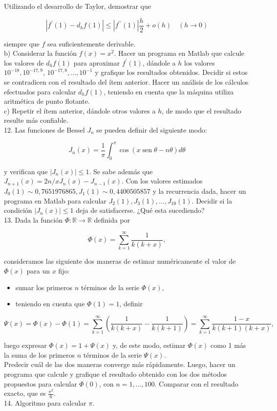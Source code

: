 \documentclass[10pt]{book}
\begin{document}
Utilizando el desarrollo de Taylor, demostrar que

$$
\left|f^{\prime}(1)-d_{h} f(1)\right| \leq\left|f^{\prime \prime}(1)\right| \frac{h}{2}+o(h) \quad(h \rightarrow 0)
$$

siempre que $f$ sea suficientemente derivable.\\
b) Considerar la función $f(x)=x^{2}$. Hacer un programa en Matlab que calcule los valores de $d_{h} f(1)$ para aproximar $f^{\prime}(1)$, dándole a $h$ los valores $10^{-18}, 10^{-17,9}$, $10^{-17,8}, \ldots, 10^{-1}$ y grafique los resultados obtenidos. Decidir si estos se contradicen con el resultado del ítem anterior. Hacer un análisis de los cálculos efectuados para calcular $d_{h} f(1)$, teniendo en cuenta que la máquina utiliza aritmética de punto flotante.\\
c) Repetir el ítem anterior, dándole otros valores a $h$, de modo que el resultado resulte más confiable.\\
12. Las funciones de Bessel $J_{n}$ se pueden definir del siguiente modo:

$$
J_{n}(x)=\frac{1}{\pi} \int_{0}^{\pi} \cos (x \operatorname{sen} \theta-n \theta) d \theta
$$

y verifican que $\left|J_{n}(x)\right| \leq 1$. Se sabe además que $J_{n+1}(x)=2 n / x J_{n}(x)-J_{n-1}(x)$. Con los valores estimados $J_{0}(1) \sim 0,7651976865, J_{1}(1) \sim 0,4400505857$ y la recurrencia dada, hacer un programa en Matlab para calcular $J_{2}(1), J_{3}(1), \ldots, J_{10}(1)$. Decidir si la condición $\left|J_{n}(x)\right| \leq 1$ deja de satisfacerse. ¿Qué esta sucediendo?\\
13. Dada la función $\Phi: \mathbb{R} \rightarrow \mathbb{R}$ definida por

$$
\Phi(x)=\sum_{k=1}^{\infty} \frac{1}{k(k+x)},
$$

consideramos las siguiente dos maneras de estimar numéricamente el valor de $\Phi(x)$ para un $x$ fijo:

\begin{itemize}
  \item sumar los primeros $n$ términos de la serie $\Phi(x)$,
  \item teniendo en cuenta que $\Phi(1)=1$, definir
\end{itemize}

$$
\Psi(x)=\Phi(x)-\Phi(1)=\sum_{k=1}^{\infty}\left(\frac{1}{k(k+x)}-\frac{1}{k(k+1)}\right)=\sum_{k=1}^{\infty} \frac{1-x}{k(k+1)(k+x)},
$$

luego expresar $\Phi(x)=1+\Psi(x)$ y, de este modo, estimar $\Phi(x)$ como 1 más la suma de los primeros $n$ términos de la serie $\Psi(x)$.\\
Predecir cuál de las dos maneras converge más rápidamente. Luego, hacer un programa que calcule y grafique el resultado obtenido con los dos métodos propuestos para calcular $\Phi(0)$, con $n=1, \ldots, 100$. Comparar con el resultado exacto, que es $\frac{\pi^{2}}{6}$.\\
14. Algoritmo para calcular $\pi$.
\end{document}
